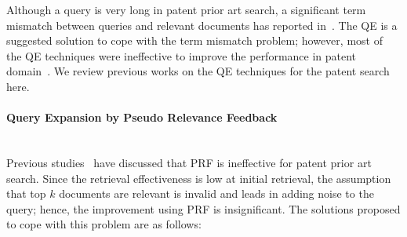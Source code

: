 Although a query is very long in patent prior art search, a significant term mismatch between queries and relevant documents has reported in~\citep{roda2010clef, magdy2010exploring}. The QE is a suggested solution to cope with the term mismatch problem; however, most of the QE techniques were ineffective to improve the performance in patent domain~\citep{kishida2003experiment, konishi2005query}. We review previous works on the QE techniques for the patent search here.
\paragraph{Query Expansion by Pseudo Relevance Feedback}
\ \\
Previous studies~\citep{magdy2011study} have discussed that PRF is ineffective for patent prior art search. Since the retrieval effectiveness is low at initial retrieval, the assumption that top $ k $ documents are relevant is invalid and leads in adding noise to the query; hence, the improvement using PRF is insignificant. The solutions proposed to cope with this problem are as follows:

